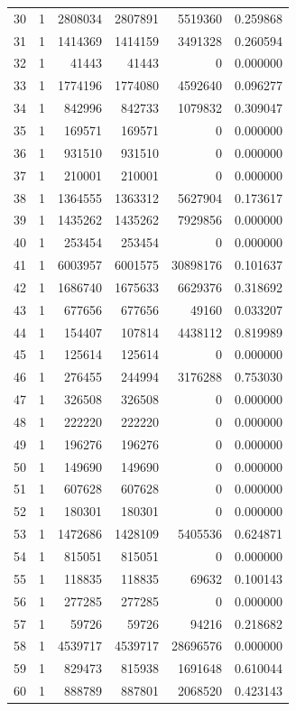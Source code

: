\begin{longtable}{rrrrrr}
30 & 1 & 2808034 & 2807891 & 5519360 & 0.259868\\
31 & 1 & 1414369 & 1414159 & 3491328 & 0.260594\\
32 & 1 & 41443 & 41443 & 0 & 0.000000\\
33 & 1 & 1774196 & 1774080 & 4592640 & 0.096277\\
34 & 1 & 842996 & 842733 & 1079832 & 0.309047\\
35 & 1 & 169571 & 169571 & 0 & 0.000000\\
36 & 1 & 931510 & 931510 & 0 & 0.000000\\
37 & 1 & 210001 & 210001 & 0 & 0.000000\\
38 & 1 & 1364555 & 1363312 & 5627904 & 0.173617\\
39 & 1 & 1435262 & 1435262 & 7929856 & 0.000000\\
40 & 1 & 253454 & 253454 & 0 & 0.000000\\
41 & 1 & 6003957 & 6001575 & 30898176 & 0.101637\\
42 & 1 & 1686740 & 1675633 & 6629376 & 0.318692\\
43 & 1 & 677656 & 677656 & 49160 & 0.033207\\
44 & 1 & 154407 & 107814 & 4438112 & 0.819989\\
45 & 1 & 125614 & 125614 & 0 & 0.000000\\
46 & 1 & 276455 & 244994 & 3176288 & 0.753030\\
47 & 1 & 326508 & 326508 & 0 & 0.000000\\
48 & 1 & 222220 & 222220 & 0 & 0.000000\\
49 & 1 & 196276 & 196276 & 0 & 0.000000\\
50 & 1 & 149690 & 149690 & 0 & 0.000000\\
51 & 1 & 607628 & 607628 & 0 & 0.000000\\
52 & 1 & 180301 & 180301 & 0 & 0.000000\\
53 & 1 & 1472686 & 1428109 & 5405536 & 0.624871\\
54 & 1 & 815051 & 815051 & 0 & 0.000000\\
55 & 1 & 118835 & 118835 & 69632 & 0.100143\\
56 & 1 & 277285 & 277285 & 0 & 0.000000\\
57 & 1 & 59726 & 59726 & 94216 & 0.218682\\
58 & 1 & 4539717 & 4539717 & 28696576 & 0.000000\\
59 & 1 & 829473 & 815938 & 1691648 & 0.610044\\
60 & 1 & 888789 & 887801 & 2068520 & 0.423143\\

\end{longtable}
